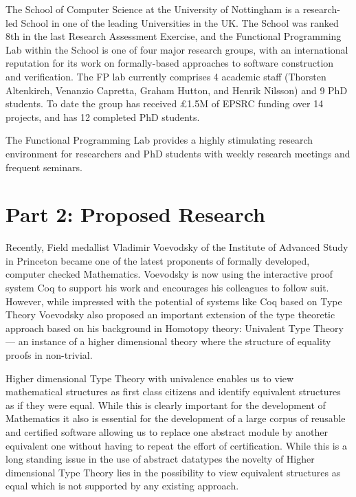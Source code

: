 \documentclass[twocolumn,a4paper]{article}
\begin{document}
The School of Computer Science at the University of Nottingham
is a research-led School in one of the leading Universities in
the UK. The School was ranked 8th in the last Research Assessment
Exercise, and the Functional Programming Lab within the School is
one of four major research groups, with an international reputation
for its work on formally-based approaches to software construction
and verification.  The FP lab currently comprises 4 academic staff
(Thorsten Altenkirch, Venanzio Capretta, Graham Hutton, and Henrik
Nilsson) and 9 PhD students.  To date the
group has received \pounds 1.5M of EPSRC funding over 14 projects,
and has 12 completed PhD students.

The Functional Programming Lab provides a highly stimulating
research environment for researchers and PhD students with weekly
research meetings and frequent seminars. 



\newpage

\section*{Part 2: Proposed Research}

Recently, Field medallist Vladimir Voevodsky of the Institute of
Advanced Study in Princeton became one of the latest proponents of
formally developed, computer checked Mathematics. Voevodsky is now
using the interactive proof system Coq to support his work and
encourages his colleagues to follow suit. However, while impressed
with the potential of systems like Coq based on Type Theory Voevodsky
also proposed an important extension of the type theoretic approach
based on his background in Homotopy theory: Univalent Type Theory ---
an instance of a higher dimensional theory where the structure of
equality proofs in non-trivial.

Higher dimensional Type Theory with univalence enables us to view
mathematical structures as first class citizens and identify
equivalent structures as if they were equal. While this is clearly
important for the development of Mathematics it also is essential for
the development of a large corpus of reusable and certified software
allowing us to replace one abstract module by another equivalent one
without having to repeat the effort of certification. While this is a
long standing issue in the use of abstract datatypes the novelty of
Higher dimensional Type Theory lies in the possibility to view equivalent
structures as equal which is not supported by any existing approach.
\end{document}
